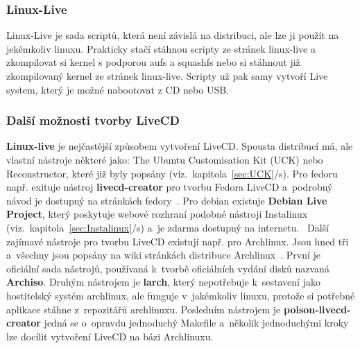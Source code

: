\documentclass[a4paper,12pt]{article}
\newcommand{\sectionV}[1]{\section{\uppercase{#1}}}	%
\newcommand{\odkazNaKapitolu}[1]{(viz.~kapitola~\ref{#1}/s\pageref{#1})}
\renewcommand{\b}[1]{\textbf{#1}} %
\renewcommand{\part}[1]{
	\refstepcounter{part}
	\addcontentsline{toc}{section}{\thepart~~\uppercase{#1}}%
\clearpage
\normalfont
	\vspace*{9cm}
	\begin{center}\huge \bfseries\thepart. \uppercase{#1}\end{center}%
	\markboth{}{}\par
\nobreak
\clearpage	
}
\begin{document}
\subsubsection{Linux-Live}
Linux-Live je sada scriptů, která není závislá na distribuci, ale lze ji použít na jekémkoliv linuxu. Prakticky stačí stáhnou scripty ze stránek linux-live a zkompilovat si kernel s podporou aufs a squashfs nebo si stáhnout již zkompilovaný kernel ze stránek linux-live. Scripty už pak samy vytvoří Live system, který je možné nabootovat z CD nebo USB.

\subsubsection{Další možnosti tvorby LiveCD}
\b{Linux-live} je nejčastější způsobem vytvoření LiveCD. Spousta distribucí má, ale vlastní nástroje některé jako: The Ubuntu Customisation Kit (UCK) nebo Reconstructor, které již byly popsány \odkazNaKapitolu{sec:UCK}. Pro fedoru např. exituje nástroj \b{livecd-creator} pro tvorbu Fedora LiveCD a~podrobný návod je dostupný na stránkách fedory~\cite{FedoraLiveCDproject}. Pro debian existuje \textbf{Debian Live Project}, který poskytuje webové rozhraní podobné nástroji Instalinux \odkazNaKapitolu{sec:Instalinux} a~je zdarma dostupný na internetu.~\cite{DebianLiveProject}
Další zajímavé nástroje pro tvorbu LiveCD existují např. pro Archlinux. Jsou hned tři a~všechny jsou popsány na wiki stránkách distribuce Archlinux~\cite{ArchWiki-BuildLiveCD}. První je oficiální sada nástrojů, používaná k~tvorbě oficiálních vydání disků nazvaná \b{Archiso}. Druhým nástrojem je \b{larch}, který nepotřebuje k~sestavení jako hostitelský systém archlinux, ale funguje v~jakémkoliv linuxu, protože si potřebné aplikace stáhne z~repozitářů archlinuxu. Posledním nástrojem je \textbf{poison-livecd-creator} jedná se o~opravdu jednoduchý Makefile a~několik jednoduchými kroky lze docílit vytvoření LiveCD na bázi Archlinuxu.

\end{document}
